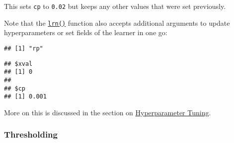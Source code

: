 \documentclass[
]{scrbook}
\newenvironment{Shaded}{\begin{snugshade}}{\end{snugshade}}
\newcommand{\AttributeTok}[1]{\textcolor[rgb]{0.77,0.63,0.00}{#1}}
\newcommand{\FloatTok}[1]{\textcolor[rgb]{0.00,0.00,0.81}{#1}}
\newcommand{\FunctionTok}[1]{\textcolor[rgb]{0.00,0.00,0.00}{#1}}
\newcommand{\NormalTok}[1]{#1}
\newcommand{\OtherTok}[1]{\textcolor[rgb]{0.56,0.35,0.01}{#1}}
\newcommand{\SpecialCharTok}[1]{\textcolor[rgb]{0.00,0.00,0.00}{#1}}
\newcommand{\StringTok}[1]{\textcolor[rgb]{0.31,0.60,0.02}{#1}}
\renewenvironment{Shaded} {\begin{snugshade}\small} {\end{snugshade}}
\begin{document}
\begin{Shaded}
\end{Shaded}

This sets \texttt{cp} to \texttt{0.02} but keeps any other values that were set previously.

Note that the \href{https://mlr3.mlr-org.com/reference/mlr_sugar.html}{\texttt{lrn()}} function also accepts additional arguments to update hyperparameters or set fields of the learner in one go:

\begin{Shaded}
\end{Shaded}

\begin{verbatim}
## [1] "rp"
\end{verbatim}

\begin{Shaded}
\end{Shaded}

\begin{verbatim}
## $xval
## [1] 0
## 
## $cp
## [1] 0.001
\end{verbatim}

More on this is discussed in the section on \href{https://mlr3book.mlr-org.com/optimization.html\#tuning}{Hyperparameter Tuning}.

\hypertarget{thresholding}{%
\subsubsection{Thresholding}\label{thresholding}}
\end{document}
